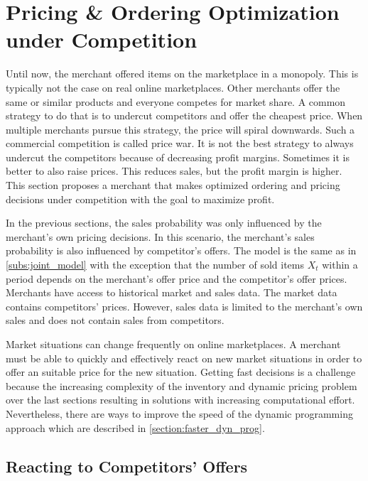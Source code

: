 \section{Pricing \& Ordering Optimization under Competition}
\label{section:competition}
Until now, the merchant offered items on the marketplace in a monopoly.
This is typically not the case on real online marketplaces.
Other merchants offer the same or similar products and everyone competes for market share.
A common strategy to do that is to undercut competitors and offer the cheapest price.
When multiple merchants pursue this strategy, the price will spiral downwards.
Such a commercial competition is called price war.
It is not the best strategy to always undercut the competitors because of decreasing profit margins.
Sometimes it is better to also raise prices.
This reduces sales, but the profit margin is higher.
This section proposes a merchant that makes optimized ordering and pricing decisions under competition with the goal to maximize profit.

In the previous sections, the sales probability was only influenced by the merchant's own pricing decisions.
In this scenario, the merchant's sales probability is also influenced by competitor's offers.
The model is the same as in \cref{subs:joint_model} with the exception that the number of sold items $X_t$ within a period depends on the merchant's offer price and the competitor's offer prices.
Merchants have access to historical market and sales data.
The market data contains competitors' prices.
However, sales data is limited to the merchant's own sales and does not contain sales from competitors.

Market situations can change frequently on online marketplaces.
A merchant must be able to quickly and effectively react on new market situations in order to offer an suitable price for the new situation.
Getting fast decisions is a challenge because the increasing complexity of the inventory and dynamic pricing problem over the last sections resulting in solutions with increasing computational effort.
Nevertheless, there are ways to improve the speed of the dynamic programming approach which are described in \cref{section:faster_dyn_prog}.

\subsection{Reacting to Competitors' Offers}


